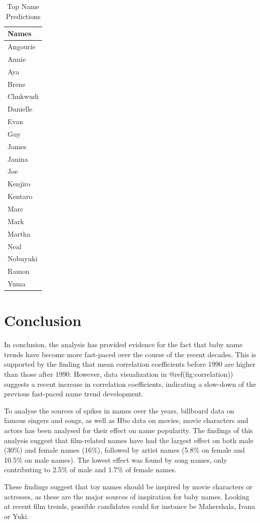 \documentclass[11pt,preprint]{elsarticle}
\numberwithin{equation}{section}
\numberwithin{figure}{section}
\numberwithin{table}{section}
\begin{document}
\begin{longtable}[t]{l}
\caption{\label{tab:recommendations}Top Name Predictions}\\
\toprule
Names\\
\midrule
Angourie\\
Annie\\
Aya\\
Brene\\
Chukwudi\\
\addlinespace
Danielle\\
Evan\\
Guy\\
James\\
Janina\\
\addlinespace
Joe\\
Kenjiro\\
Kentaro\\
Marc\\
Mark\\
\addlinespace
Martha\\
Neal\\
Nobuyuki\\
Ramon\\
Yuma\\
\bottomrule
\end{longtable}

\section{Conclusion}\label{conclusion}

In conclusion, the analysis has provided evidence for the fact that baby
name trends have become more fast-paced over the course of the recent
decades. This is supported by the finding that mean correlation
coefficients before 1990 are higher than those after 1990. However, data
visualization in @ref(fig:correlation)) suggests a recent increase in
correlation coefficients, indicating a slow-down of the previous
fast-paced name trend development.

To analyse the sources of spikes in names over the years, billboard data
on famous singers and songs, as well as Hbo data on movies, movie
characters and actors has been analysed for their effect on name
popularity. The findings of this analysis suggest that film-related
names have had the largest effect on both male (30\%) and female names
(16\%), followed by artist names (5.8\% on female and 10.5\% on male
names). The lowest effect was found by song names, only contributing to
2.5\% of male and 1.7\% of female names.

These findings suggest that toy names should be inspired by movie
characters or actresses, as these are the major sources of inspiration
for baby names. Looking at recent film trends, possible candidates could
for instance be Mahershala, Ivana or Yuki.

\newpage


\end{document}
